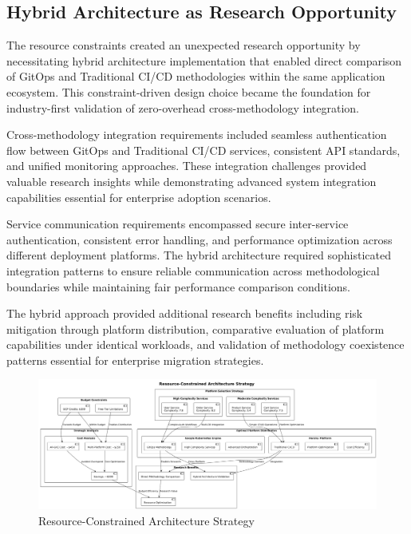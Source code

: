 
\subsection{Hybrid Architecture as Research Opportunity}

The resource constraints created an unexpected research opportunity by necessitating hybrid architecture implementation that enabled direct comparison of GitOps and Traditional CI/CD methodologies within the same application ecosystem. This constraint-driven design choice became the foundation for industry-first validation of zero-overhead cross-methodology integration.

Cross-methodology integration requirements included seamless authentication flow between GitOps and Traditional CI/CD services, consistent API standards, and unified monitoring approaches. These integration challenges provided valuable research insights while demonstrating advanced system integration capabilities essential for enterprise adoption scenarios.

Service communication requirements encompassed secure inter-service authentication, consistent error handling, and performance optimization across different deployment platforms. The hybrid architecture required sophisticated integration patterns to ensure reliable communication across methodological boundaries while maintaining fair performance comparison conditions.


The hybrid approach provided additional research benefits including risk mitigation through platform distribution, comparative evaluation of platform capabilities under identical workloads, and validation of methodology coexistence patterns essential for enterprise migration strategies.

\begin{figure}[h]
\centering
\includegraphics[width=1.0\textwidth]{figures/Resource-Constrained-Architecture-Strategy.png}
\caption{Resource-Constrained Architecture Strategy}
\label{fig:resource-constrained-architecture}
\end{figure}

